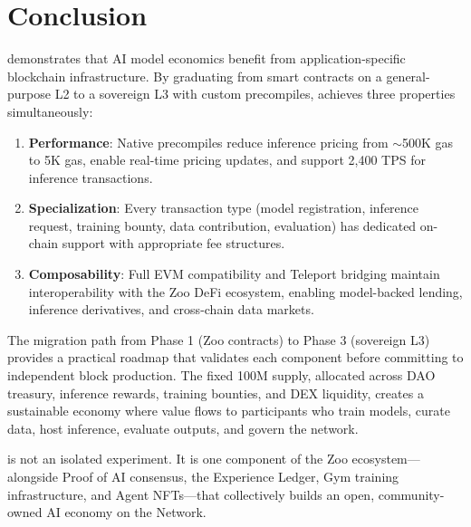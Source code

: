 \section{Conclusion}
\label{sec:conclusion}

\Beluga{} demonstrates that AI model economics benefit from application-specific blockchain infrastructure. By graduating from smart contracts on a general-purpose L2 to a sovereign L3 with custom precompiles, \Beluga{} achieves three properties simultaneously:

\begin{enumerate}
    \item \textbf{Performance}: Native precompiles reduce inference pricing from $\sim$500K gas to 5K gas, enable real-time pricing updates, and support 2,400 TPS for inference transactions.
    \item \textbf{Specialization}: Every transaction type (model registration, inference request, training bounty, data contribution, evaluation) has dedicated on-chain support with appropriate fee structures.
    \item \textbf{Composability}: Full EVM compatibility and Teleport bridging maintain interoperability with the Zoo DeFi ecosystem, enabling model-backed lending, inference derivatives, and cross-chain data markets.
\end{enumerate}

The migration path from Phase 1 (Zoo contracts) to Phase 3 (sovereign L3) provides a practical roadmap that validates each component before committing to independent block production. The fixed 100M \BLG{} supply, allocated across DAO treasury, inference rewards, training bounties, and DEX liquidity, creates a sustainable economy where value flows to participants who train models, curate data, host inference, evaluate outputs, and govern the network.

\Beluga{} is not an isolated experiment. It is one component of the Zoo ecosystem---alongside Proof of AI consensus, the Experience Ledger, Gym training infrastructure, and Agent NFTs---that collectively builds an open, community-owned AI economy on the \Lux{} Network.


